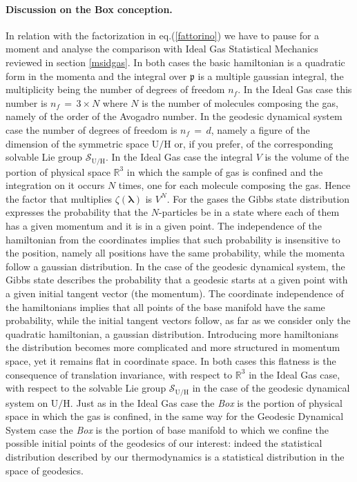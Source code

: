 \documentclass[10pt,a4paper]{article}
\begin{document}
 \paragraph{Discussion on the Box conception.} In relation with the factorization in eq.(\ref{fattorino}) we have to pause for a moment and analyse the comparison with Ideal Gas Statistical Mechanics reviewed in section \ref{msidgas}. In both cases the basic hamiltonian is a quadratic  form in the momenta and the integral over $\boldsymbol{\mathfrak{p}}$ is a multiple gaussian integral, the multiplicity being the number of degrees of freedom $n_f$. In the Ideal Gas case this number is $n_f\, = \, 3\times N$ where $N$ is the number of molecules composing the gas, namely of the order of the Avogadro number. In the geodesic dynamical system case the number of degrees of freedom is $n_f \, = \, d$, namely a figure of the dimension of the symmetric space $\mathrm{U/H}$ or, if you prefer, of the corresponding solvable Lie group $\mathcal{S}_{\mathrm{U/H}}$. In the Ideal Gas case the integral $V$ is the volume of the portion of
 physical space $\mathbb{R}^3$ in which the sample of gas is confined and the integration on it occurs $N$ times, one for each molecule composing the gas. Hence the factor that multiplies $\zeta(\boldsymbol{\lambda})$ is $V^N$. For the gases the Gibbs state
 distribution expresses the probability that the $N$-particles be in a state where each of them has a given momentum and it is in a given point. The independence of the hamiltonian from the coordinates implies that such probability is insensitive to the position, namely all positions have the same probability, while the momenta follow a gaussian distribution. In the case of the geodesic dynamical system,
 the Gibbs state describes the probability that a geodesic starts at a given point with a given initial tangent vector (the momentum). The coordinate independence of the hamiltonians implies that all points of the base manifold have the same probability, while the initial tangent vectors follow, as far as we consider only the quadratic hamiltonian, a gaussian distribution.  Introducing more hamiltonians the distribution becomes more complicated and more structured in momentum space, yet it remains flat in coordinate space. In both cases this flatness is the consequence of translation invariance, with respect to $\mathbb{R}^3$ in the Ideal Gas case, with respect to the solvable Lie group $\mathcal{S}_{\mathrm{U/H}}$ in the case of the geodesic dynamical system on $\mathrm{U/H}$. Just as in the Ideal Gas case the \textit{Box} is the portion of physical space in which the gas is confined, in the same way for the Geodesic Dynamical System case the \textit{Box} is the portion of base manifold to which we confine the possible initial points of the geodesics of our interest: indeed the statistical distribution described by our thermodynamics is a statistical distribution in the space of geodesics.
\end{document}
